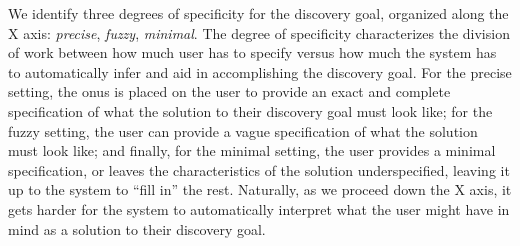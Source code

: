 \par 
 We identify three degrees of specificity
for the discovery goal, organized along the X axis:
{\em precise}, {\em fuzzy}, {\em minimal}.
The degree of specificity characterizes the division
of work between how much user has to specify
versus how much the system has to automatically
infer and aid in accomplishing the discovery goal. 
For the precise setting, the onus is placed on the user
to provide an exact and complete specification of 
what the solution to their discovery
goal must look like;
for the fuzzy setting, the user can provide
a vague specification of what the solution must look like;
and finally, for the minimal setting,
the user provides a minimal specification, or
leaves the characteristics of the solution underspecified,
leaving it up to the system to ``fill in'' the rest.
Naturally, as we proceed down the X axis,
it gets harder for the system to automatically
interpret what the user might have in mind as a solution
to their discovery goal.



